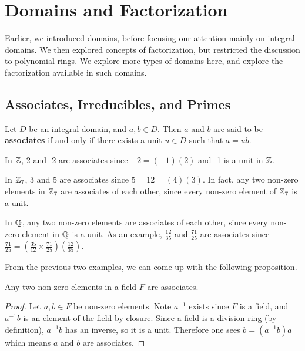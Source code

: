\chapter{Domains and Factorization}
Earlier, we introduced domains, before focusing our attention mainly on integral domains. We then explored concepts of factorization, but restricted the discussion to polynomial rings. We explore more types of domains here, and explore the factorization available in such domains.

\section{Associates, Irreducibles, and Primes}
\begin{definition}
    Let $D$ be an integral domain, and $a,b \in D$. Then $a$ and $b$ are said to be \textbf{associates} if and only if there exists a unit $u \in D$ such that $a = ub$.
\end{definition}

\begin{example}
    In $\mathbb{Z}$, 2 and -2 are associates since $-2 = (-1)(2)$ and -1 is a unit in $\mathbb{Z}$.
\end{example}

\begin{example}
    In $\mathbb{Z}_7$, 3 and 5 are associates since $5 = 12 = (4)(3)$. In fact, any two non-zero elements in $\mathbb{Z}_7$ are associates of each other, since every non-zero element of $\mathbb{Z}_7$ is a unit.
\end{example}

\begin{example}
    In $\mathbb{Q}$, any two non-zero elements are associates of each other, since every non-zero element in $\mathbb{Q}$ is a unit. As an example, $\frac{12}{35}$ and $\frac{71}{25}$ are associates since $\frac{71}{25} = \left(\frac{35}{12} \times \frac{71}{25}\right)\left(\frac{12}{35}\right)$.
\end{example}

From the previous two examples, we can come up with the following proposition.

\begin{proposition}
    Any two non-zero elements in a field $F$ are associates.
\end{proposition}
\begin{proof}
    Let $a, b \in F$ be non-zero elements. Note $a^{-1}$ exists since $F$ is a field, and $a^{-1}b$ is an element of the field by closure. Since a field is a division ring (by definition), $a^{-1}b$ has an inverse, so it is a unit. Therefore one sees $b = (a^{-1}b)a$ which means $a$ and $b$ are associates.
\end{proof}

